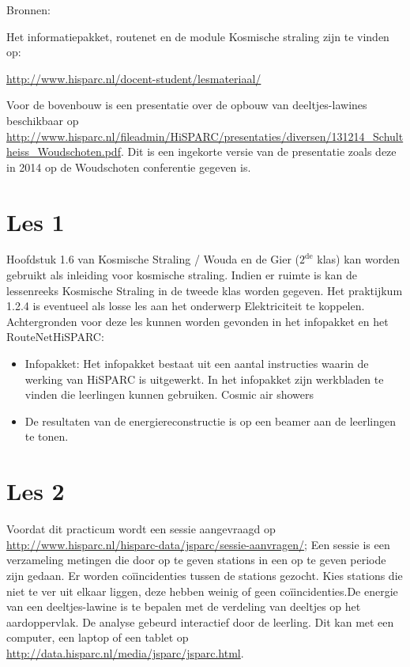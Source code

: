 Bronnen:

Het informatiepakket, routenet en de module Kosmische straling zijn te vinden op:

\url{http://www.hisparc.nl/docent-student/lesmateriaal/}

Voor de bovenbouw is een presentatie over de opbouw van deeltjes-lawines beschikbaar op \url{http://www.hisparc.nl/fileadmin/HiSPARC/presentaties/diversen/131214_Schultheiss_Woudschoten.pdf}. Dit is een ingekorte versie van de presentatie zoals deze in 2014 op de Woudschoten conferentie gegeven is.

\section{Les 1}

Hoofdstuk 1.6 van Kosmische Straling / Wouda en de Gier ($2^{\mathrm{de}}$ klas) kan worden gebruikt als inleiding voor kosmische straling. Indien er ruimte is kan de lessenreeks Kosmische Straling in de tweede klas worden gegeven. Het praktijkum 1.2.4 is eventueel als losse les aan het onderwerp Elektriciteit te koppelen.
Achtergronden voor deze les kunnen worden gevonden in het infopakket en het RouteNetHiSPARC:

\begin{itemize}
\item Infopakket: Het infopakket bestaat uit een aantal instructies waarin de werking van HiSPARC is uitgewerkt. In het infopakket zijn werkbladen te vinden die leerlingen kunnen gebruiken. Cosmic air showers
\item De resultaten van de energiereconstructie is op een beamer aan de leerlingen te tonen.
\end{itemize}

\section{Les 2}

Voordat dit practicum wordt een sessie aangevraagd op \url{http://www.hisparc.nl/hisparc-data/jsparc/sessie-aanvragen/}; Een sessie is een verzameling metingen die door op te geven stations in een op te geven periode zijn gedaan. Er worden co\"{i}incidenties tussen de stations gezocht. Kies stations die niet te ver uit elkaar liggen, deze hebben weinig of geen co\"{i}incidenties.De energie van een deeltjes-lawine is te bepalen met de verdeling van deeltjes op het aardoppervlak. De analyse gebeurd interactief door de leerling. Dit kan met een computer, een laptop of een tablet op \url{http://data.hisparc.nl/media/jsparc/jsparc.html}.

